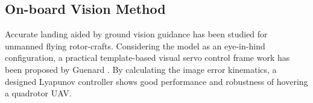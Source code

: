 %
%

\subsection{On-board Vision Method}
Accurate landing aided by ground vision guidance has been studied for unmanned flying rotor-crafts.
Considering the model as an eye-in-hind configuration, a practical template-based visual servo control frame work has been proposed by Guenard \cite{mahony2016modeling}. By calculating the image error kinematics, a designed Lyapunov controller shows good performance and robustness of hovering a quadrotor UAV. 


